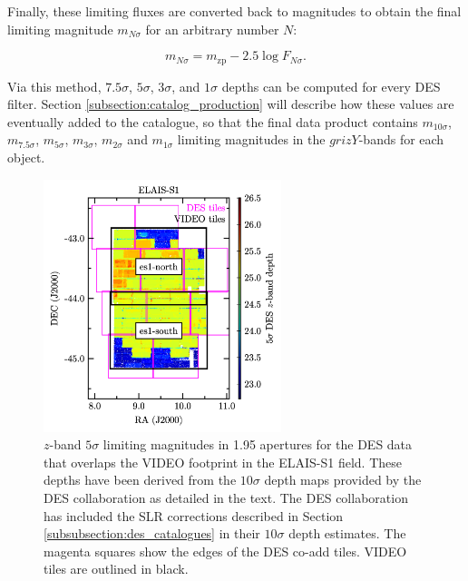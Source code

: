 \noindent Finally, these limiting fluxes are converted back to magnitudes to obtain the final limiting magnitude $m_{N\sigma}$ for an arbitrary number $N$:

\begin{equation}
m_{N\sigma} = m_{\mathrm{zp}} -2.5\log{F_{N\sigma}}  \label{eqn:m_n}  .
\end{equation}

\noindent Via this method, $7.5\sigma$, $5\sigma$, $3\sigma$, and $1\sigma$ depths can be computed for every DES filter. Section \ref{subsection:catalog_production} will describe how these values are eventually added to the \DESVIDEO catalogue, so that the final data product contains $m_{10\sigma}$, $m_{7.5\sigma}$, $m_{5\sigma}$, $m_{3\sigma}$, $m_{2\sigma}$ and $m_{1\sigma}$ limiting magnitudes in the $grizY$-bands for each object. \par 


\begin{figure}[!ph] 
\centering    
\includegraphics[width=0.618\textwidth]{field_outline_es1.png}
\caption[Depths in the ELAIS-S1 field]{$z$-band $5\sigma$ limiting magnitudes in \SI{1.95}{\arcsec} apertures for the DES data that overlaps the VIDEO footprint in the ELAIS-S1 field. These depths have been derived from the $10\sigma$ depth maps provided by the DES collaboration as detailed in the text. The DES collaboration has included the SLR corrections described in Section \ref{subsubsection:des_catalogues} in their $10\sigma$ depth estimates. The magenta squares show the edges of the DES co-add tiles. VIDEO tiles are outlined in black.}
\label{fig:depth_es1}
\end{figure}

